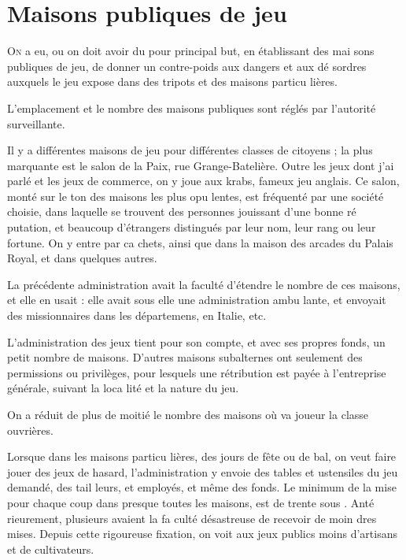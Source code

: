 \chapter
  [Maisons publiques de Jeu]
  {Maisons publiques de jeu \notemark}


\lettrine{O}{n} a eu, ou on doit avoir du pour
principal but, en établissant des mai%
sons publiques de jeu, de donner un
contre-poids aux dangers et aux dé%
sordres auxquels le jeu expose dans
des tripots et des maisons particu%
lières.

L'emplacement et le nombre des
maisons publiques sont réglés par
l'autorité surveillante.

Il y a différentes maisons de jeu
pour différentes classes de citoyens ;
la plus marquante est le salon de la
Paix, rue Grange-Batelière. Outre
les jeux dont j'ai parlé et les jeux
de commerce, on y joue aux krabs,
fameux jeu anglais. Ce salon, monté
sur le ton des maisons les plus opu%
lentes, est fréquenté par une société
choisie, dans laquelle se trouvent des
personnes jouissant d'une bonne ré%
putation, et beaucoup d'étrangers
distingués par leur nom, leur rang
ou leur fortune. On y entre par ca%
chets, ainsi que dans la maison des
arcades du Palais Royal, et dans
quelques autres.

La précédente administration avait 
la faculté d'étendre le nombre de ces
maisons, et elle en usait : elle avait
sous elle une administration ambu%
lante, et envoyait des missionnaires
dans les départemens, en Italie, etc.

L'administration des jeux tient pour
son compte, et avec ses propres fonds,
un petit nombre de maisons. D'autres
maisons subalternes ont seulement
des permissions ou privilèges, pour
lesquels une rétribution est payée à
l'entreprise générale, suivant la loca%
lité et la nature du jeu.

On a réduit de plus de moitié le
nombre des maisons où va joueur la
classe ouvrières.

Lorsque dans les maisons particu%
lières, des jours de fête ou de bal,
on veut faire jouer des jeux de hasard,
l'administration y envoie des tables et
ustensiles du jeu demandé, des tail%
leurs, et employés, et même des
fonds. Le minimum de la mise pour
chaque coup dans presque toutes les
maisons, est de trente sous \notemark. Anté%
%
rieurement, plusieurs avaient la fa%
culté désastreuse de recevoir de moin%
dres mises. Depuis cette rigoureuse
fixation, on voit aux jeux publics
moins d'artisans et de cultivateurs.

